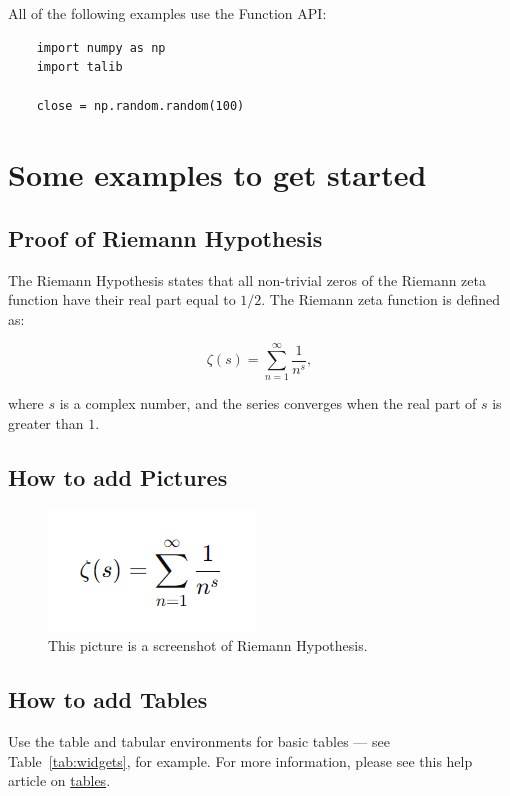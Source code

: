 \documentclass{article}
\begin{document}
All of the following examples use the Function API:

\begin{verbatim}
    import numpy as np
    import talib
    
    close = np.random.random(100)
\end{verbatim}

\section{Some examples to get started}

\subsection{Proof of Riemann Hypothesis}

The Riemann Hypothesis states that all non-trivial zeros of the Riemann zeta function have their real part equal to $1/2$. The Riemann zeta function is defined as:

\[
\zeta(s) = \sum_{n=1}^{\infty} \frac{1}{n^s} ,
\]

where $s$ is a complex number, and the series converges when the real part of $s$ is greater than $1$.

\subsection{How to add Pictures}

\begin{figure}[htbp]
\centering
\includegraphics[width=0.25\linewidth]{Riemann.png}
\caption{\label{fig:Riemann}This picture is a screenshot of Riemann Hypothesis.}
\end{figure}

\subsection{How to add Tables}

Use the table and tabular environments for basic tables --- see Table~\ref{tab:widgets}, for example. For more information, please see this help article on \href{https://www.overleaf.com/learn/latex/tables}{tables}. 
\end{document}
